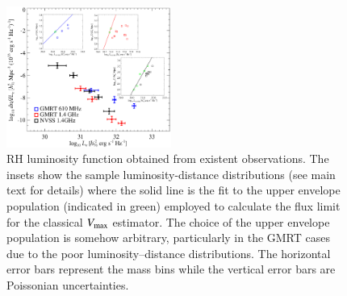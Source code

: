 \documentclass[useAMS,usenatbib]{mn2e}
\begin{document}
\begin{appendix}
\begin{figure} 
\centering
\includegraphics[width=0.48\textwidth]{figures/RLF_observations.eps}
\caption{RH luminosity function obtained from existent observations. The insets
  show the sample luminosity-distance distributions (see main text for details)
  where the solid line is the fit to the upper envelope population (indicated in
  green) employed to calculate the flux limit for the classical $V_{{\mathrm{max}}}$
  estimator. The choice of the upper envelope population is somehow arbitrary,
  particularly in the GMRT cases due to the poor luminosity--distance
  distributions. The horizontal error bars represent the mass bins while the
  vertical error bars are Poissonian uncertainties.}
\label{fig:RLFobs}
\end{figure}



\end{appendix}


\label{lastpage}
\end{document}

